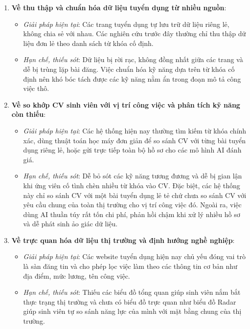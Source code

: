 \begin{enumerate}
    \item \textbf{Về thu thập và chuẩn hóa dữ liệu tuyển dụng từ nhiều nguồn}:
    \begin{itemize}
        \item \textit{Giải pháp hiện tại}: Các trang tuyển dụng tự lưu trữ dữ liệu riêng lẻ, không chia sẻ với nhau. Các nghiên cứu trước đây thường chỉ thu thập dữ liệu đơn lẻ theo danh sách từ khóa cố định.
        \item \textit{Hạn chế, thiếu sót}: Dữ liệu bị rời rạc, không đồng nhất giữa các trang và dễ bị trùng lặp bài đăng. Việc chuẩn hóa kỹ năng dựa trên từ khóa cố định nên khó bóc tách được các kỹ năng nằm ẩn trong đoạn mô tả công việc thô.
    \end{itemize}

    \item \textbf{Về so khớp CV sinh viên với vị trí công việc và phân tích kỹ năng còn thiếu}:
    \begin{itemize}
        \item \textit{Giải pháp hiện tại}: Các hệ thống hiện nay thường tìm kiếm từ khóa chính xác, dùng thuật toán học máy đơn giản để so sánh CV với từng bài tuyển dụng riêng lẻ, hoặc gửi trực tiếp toàn bộ hồ sơ cho các mô hình AI đánh giá.
        \item \textit{Hạn chế, thiếu sót}: Dễ bỏ sót các kỹ năng tương đương và dễ bị gian lận khi ứng viên cố tình chèn nhiều từ khóa vào CV. Đặc biệt, các hệ thống này chỉ so sánh CV với một bài tuyển dụng lẻ tẻ chứ chưa so sánh CV với yêu cầu chung của toàn thị trường cho vị trí công việc đó. Ngoài ra, việc dùng AI thuần túy rất tốn chi phí, phản hồi chậm khi xử lý nhiều hồ sơ và dễ phát sinh ảo giác dữ liệu.
    \end{itemize}

    \item \textbf{Về trực quan hóa dữ liệu thị trường và định hướng nghề nghiệp}:
    \begin{itemize}
        \item \textit{Giải pháp hiện tại}: Các website tuyển dụng hiện nay chủ yếu đóng vai trò là sàn đăng tin và cho phép lọc việc làm theo các thông tin cơ bản như địa điểm, mức lương, tên công việc.
        \item \textit{Hạn chế, thiếu sót}: Thiếu các biểu đồ tổng quan giúp sinh viên nắm bắt thực trạng thị trường và chưa có biểu đồ trực quan như biểu đồ Radar giúp sinh viên tự so sánh năng lực của mình với mặt bằng chung của thị trường.
    \end{itemize}
\end{enumerate}

